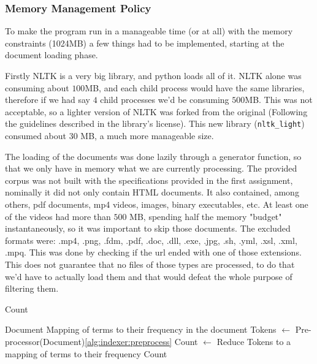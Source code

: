 \documentclass[sigconf,authorversion,nonacm]{acmart}
\def\code#1{\texttt{#1}}
\begin{document}
\subsubsection{Memory Management Policy}

To make the program run in a manageable time (or at all) with the memory constraints (1024MB) a few things had to be implemented, starting at the document loading phase.

Firstly NLTK is a very big library, and python loads all of it. NLTK alone was consuming about $100$MB, and each child process would have the same libraries, therefore if we had say $4$ child processes we'd be consuming $500$MB. This was not acceptable, so a lighter version of NLTK was forked from the original (Following the guidelines described in the library's license). This new library (\code{nltk\_light}) consumed about $30$ MB, a much more manageable size.

The loading of the documents was done lazily through a generator function, so that we only have in memory what we are currently processing. The provided corpus was not built with the specifications provided in the first assignment, nominally it did not only contain HTML documents. It also contained, among others, pdf documents, mp4 videos, images, binary executables, etc. At least one of the videos had more than $500$ MB, spending half the memory "budget" instantaneously, so it was important to skip those documents. The excluded formats were: .mp4, .png, .fdm, .pdf, .doc, .dll, .exe, .jpg, .sh, .yml, .xsl, .xml, .mpq. This was done by checking if the url ended with one of those extensions. This does not guarantee that no files of those types are processed, to do that we'd have to actually load them and that would defeat the whole purpose of filtering them.

\begin{algorithm}
  \caption{Count}\label{alg:indexer:count}
  \begin{algorithmic}
    \Require Document
    \Ensure Mapping of terms to their frequency in the document
    \State Tokens $\gets$ Pre-processor(Document)\ref{alg:indexer:preprocess}
    \State Count $\gets$ Reduce Tokens to a mapping of terms to their frequency
    \State \Return Count
  \end{algorithmic}
\end{algorithm}
\end{document}
